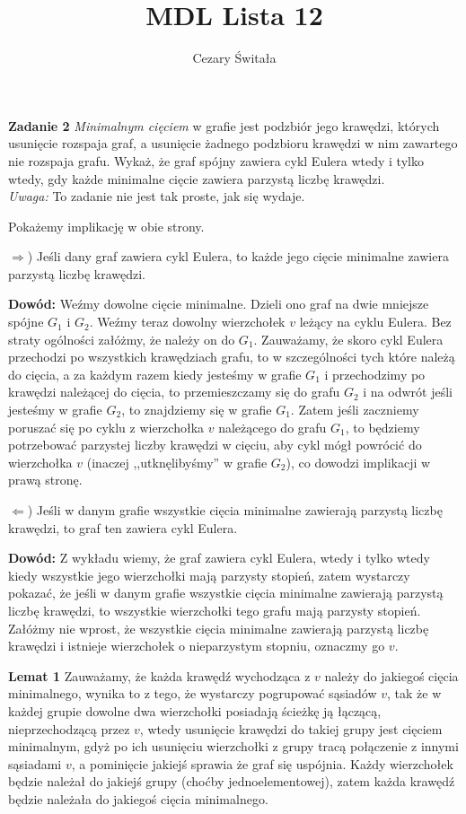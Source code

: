 \documentclass[12pt,a4paper]{article}
\title{MDL Lista 12}
\author{Cezary Świtała}
\begin{document}
\maketitle

\textbf{Zadanie 2} \textit{Minimalnym cięciem} w grafie jest podzbiór jego krawędzi, których usunięcie rozspaja graf, a usunięcie żadnego podzbioru krawędzi w nim zawartego nie rozspaja grafu. Wykaż, że graf spójny zawiera cykl Eulera wtedy i tylko wtedy, gdy każde minimalne cięcie zawiera parzystą liczbę krawędzi.\\
\textit{Uwaga:} To zadanie nie jest tak proste, jak się wydaje.
\vskip 0.2cm

Pokażemy implikację w obie strony.

\( \Rightarrow \)) Jeśli dany graf zawiera cykl Eulera, to każde jego cięcie minimalne zawiera parzystą liczbę krawędzi.

\textbf{Dowód:} Weźmy dowolne cięcie minimalne. Dzieli ono graf na dwie mniejsze spójne \(G_1\) i \(G_2\). Weźmy teraz dowolny wierzchołek \(v\) leżący na cyklu Eulera. Bez straty ogólności załóżmy, że należy on do \(G_1\). Zauważamy, że skoro cykl Eulera przechodzi po wszystkich krawędziach grafu, to w szczególności tych które należą do cięcia, a za każdym razem kiedy jesteśmy w grafie \(G_1\) i przechodzimy po krawędzi należącej do cięcia, to przemieszczamy się do grafu \(G_2\) i na odwrót jeśli jesteśmy w grafie \(G_2\), to znajdziemy się w grafie \(G_1\). Zatem jeśli zaczniemy poruszać się po cyklu z wierzchołka \(v\) należącego do grafu \(G_1\), to będziemy potrzebować parzystej liczby krawędzi w cięciu, aby cykl mógł powrócić do wierzchołka \(v\) (inaczej ,,utknęlibyśmy'' w grafie \(G_2\)), co dowodzi implikacji w prawą stronę.

\( \Leftarrow \)) Jeśli w danym grafie wszystkie cięcia minimalne zawierają parzystą liczbę krawędzi, to graf ten zawiera cykl Eulera.

\textbf{Dowód:} Z wykładu wiemy, że graf zawiera cykl Eulera, wtedy i tylko wtedy kiedy wszystkie jego wierzchołki mają parzysty stopień, zatem wystarczy pokazać, że jeśli w danym grafie wszystkie cięcia minimalne zawierają parzystą liczbę krawędzi, to wszystkie wierzchołki tego grafu mają parzysty stopień.
Załóżmy nie wprost, że wszystkie cięcia minimalne zawierają parzystą liczbę krawędzi i istnieje wierzchołek o nieparzystym stopniu, oznaczmy go \(v\).

\textbf{Lemat 1} Zauważamy, że każda krawędź wychodząca z \(v\) należy do jakiegoś cięcia minimalnego, wynika to z tego, że wystarczy pogrupować sąsiadów \(v\), tak że w każdej grupie dowolne dwa wierzchołki posiadają ścieżkę ją łączącą, nieprzechodzącą przez \(v\), wtedy usunięcie krawędzi do takiej grupy jest cięciem minimalnym, gdyż po ich usunięciu wierzchołki z grupy tracą połączenie z innymi sąsiadami \(v\), a pominięcie jakiejś sprawia że graf się uspójnia. Każdy wierzchołek będzie należał do jakiejś grupy (choćby jednoelementowej), zatem każda krawędź będzie należała do jakiegoś cięcia minimalnego.
\end{document}
